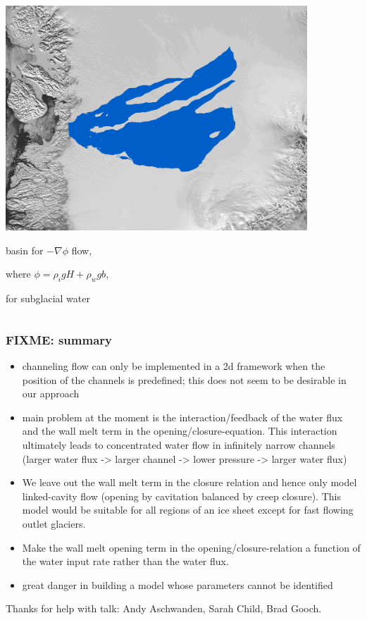 \documentclass[hide notes,intlimits]{beamer}
\begin{document}
\begin{frame}
\begin{columns}
\begin{column}{0.5\textwidth}
\begin{center}
\includegraphics[width=0.85\textwidth]{figs/hydro-mask}

basin for $-\nabla \phi$ flow,

where $\phi = \rho_i g H + \rho_w g b$,

for subglacial water
\end{center}
\end{column}
\end{columns}

\end{frame}


{
} 


\begin{frame}
  \frametitle{FIXME: summary}

\small
  \begin{itemize}
  \item channeling flow can only be implemented in a 2d framework when the position of the channels is predefined; this does not seem to be desirable in our approach
  \item main problem at the moment is the interaction/feedback of the water flux and the wall melt term in the opening/closure-equation. This interaction ultimately leads to concentrated water flow in infinitely narrow channels (larger water flux ->  larger channel -> lower pressure -> larger water flux)
  \item We leave out the wall melt term in the closure relation and hence only model linked-cavity flow (opening by cavitation balanced by creep closure). This model would be suitable for all regions of an ice sheet except for fast flowing outlet glaciers.
  \item Make the wall melt opening term in the opening/closure-relation a function of the water input rate rather than the water flux.
  \item \alert{great danger} in building a model whose parameters cannot be identified
  \end{itemize}
  
  \begin{center}
  \tiny Thanks for help with talk: Andy Aschwanden, Sarah Child, Brad Gooch.
  \end{center}
\end{frame}
\end{document}
